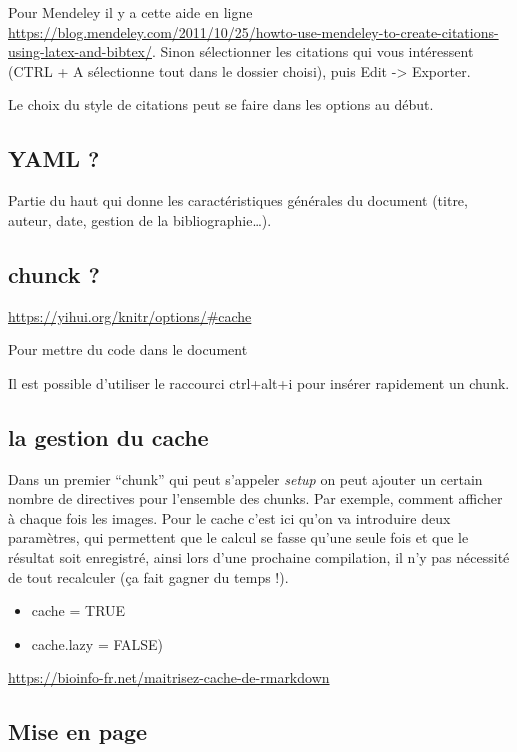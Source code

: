 \documentclass[
  12pt,
  american,
  a4paper,
  extrafontsizes,onecolumn,openright
  ]{memoir}
\begin{document}
Pour Mendeley il y a cette aide en ligne \url{https://blog.mendeley.com/2011/10/25/howto-use-mendeley-to-create-citations-using-latex-and-bibtex/}. Sinon sélectionner les citations qui vous intéressent (CTRL + A sélectionne tout dans le dossier choisi), puis Edit -\textgreater{} Exporter.

Le choix du style de citations peut se faire dans les options au début.

\hypertarget{yaml}{%
\subsection{YAML ?}\label{yaml}}

Partie du haut qui donne les caractéristiques générales du document (titre, auteur, date, gestion de la bibliographie\ldots).

\hypertarget{chunck}{%
\subsection{chunck ?}\label{chunck}}

\url{https://yihui.org/knitr/options/\#cache}

Pour mettre du code dans le document

Il est possible d'utiliser le raccourci ctrl+alt+i pour insérer rapidement un chunk.

\hypertarget{la-gestion-du-cache}{%
\subsection{la gestion du cache}\label{la-gestion-du-cache}}

Dans un premier ``chunk'' qui peut s'appeler \emph{setup }on peut ajouter un certain nombre de directives pour l'ensemble des chunks. Par exemple, comment afficher à chaque fois les images. Pour le cache c'est ici qu'on va introduire deux paramètres, qui permettent que le calcul se fasse qu'une seule fois et que le résultat soit enregistré, ainsi lors d'une prochaine compilation, il n'y pas nécessité de tout recalculer (ça fait gagner du temps !).

\begin{itemize}
\item
  cache = TRUE
\item
  cache.lazy = FALSE)
\end{itemize}

\url{https://bioinfo-fr.net/maitrisez-cache-de-rmarkdown}

\hypertarget{mise-en-page}{%
\subsection{Mise en page}\label{mise-en-page}}
\end{document}
